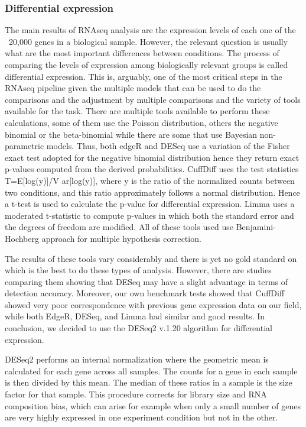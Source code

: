 \subsubsection{Differential expression}
The main results of RNAseq analysis are the expression levels of each one of the ~20,000 genes in a biological sample. However, the relevant question is usually what are the most important differences between conditions. The process of comparing the levels of expression among biologically relevant groups is called differential expression. This is, arguably, one of the most critical steps in the RNAseq pipeline given the multiple models that can be used to do the comparisons and the adjustment by multiple comparisons and the variety of tools available for the task. There are multiple tools available to perform these calculations, some of them use the Poisson distribution, others the negative binomial or the beta-binomial while there are some that use Bayesian non-parametric models. Thus, both edgeR and DESeq use a variation of the Fisher exact test adopted for the negative binomial distribution hence they return exact p-values computed from the derived probabilities. CuffDiff uses the test statistics T=E[log(y)]/V ar[log(y)], where y is the ratio of the normalized counts between two conditions, and this ratio approximately follows a normal distribution. Hence a t-test is used to calculate the p-value for differential expression. Limma uses a moderated t-statistic to compute p-values in which both the standard error and the degrees of freedom are modified. All of these tools used use Benjamini-Hochberg approach for multiple hypothesis correction.

The results of these tools vary considerably and there is yet no gold standard on which is the best to do these types of analysis. However, there are studies comparing them showing that DESeq may have a slight advantage in terms of detection accuracy. Moreover, our own benchmark tests showed that CuffDiff showed very poor correspondence with previous gene expression data on our field, while both EdgeR, DESeq, and Limma had similar and good results. In conclusion, we decided to use the DESeq2 v.1.20 algorithm for differential expression.\cite{Love2014}

DESeq2 performs an internal normalization where the geometric mean is calculated for each gene across all samples. The counts for a gene in each sample is then divided by this mean. The median of these ratios in a sample is the size factor for that sample. This procedure corrects for library size and RNA composition bias, which can arise for example when only a small number of genes are very highly expressed in one experiment condition but not in the other.

